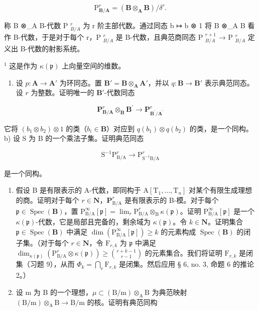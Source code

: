 \[
\mathrm{P} _ {\mathbf {B} / \mathbf {A}} ^ {r} = (\mathbf {B} \otimes_ {\mathbf {A}} \mathbf {B}) / \delta^ {r}.
\]

称 B ⊗\_A B-代数 P \(_{B/A}^{r}\) 为 r 阶主部代数。通过同态 b ↦ b ⊗ 1 将 B ⊗\_A B 看作 B-代数，于是对于每个 r，P \(_{B/A}^{r}\) 是 B-代数，且典范商同态 P \(_{B/A}^{r+1}\) → P \(_{B/A}^{r}\) 定义出 B-代数的射影系统。

\(^{1}\) 这是作为 \(\kappa(\mathfrak{p})\) 上向量空间的维数。

\begin{enumerate}
\def\labelenumi{\alph{enumi})}
\tightlist
\item
  设 \(p: \mathbf{A} \to \mathbf{A}'\) 为环同态。置 \(\mathbf{B}' = \mathbf{B} \otimes_{\mathbf{A}} \mathbf{A}'\)，并以 \(q: \mathbf{B} \to \mathbf{B}'\) 表示典范同态。设 \(r\) 为整数。证明唯一的 \(\mathbf{B}'\)-代数同态
\end{enumerate}

\[
\mathbf {P} _ {\mathbf {B} / \mathbf {A}} ^ {r} \otimes_ {\mathbf {B}} \mathbf {B} ^ {\prime} \rightarrow \mathbf {P} _ {\mathbf {B} ^ {\prime} / \mathbf {A} ^ {\prime}} ^ {r}
\]

它将 \((b_{1} \otimes b_{2}) \otimes 1\) 的类（\(b_{i} \in \mathbf{B}\)）对应到 \(q(b_{1}) \otimes q(b_{2})\) 的类，是一个同构。b) 设 S 为 B 的一个乘法子集。证明典范同态

\[
\mathrm{S} ^ {- 1} \mathrm{P} _ {\mathrm{B/A}} ^ {r} \rightarrow \mathrm{P} _ {\mathrm{S} ^ {- 1} \mathrm{B/A}} ^ {r}
\]

是一个同构。

\begin{enumerate}
\def\labelenumi{\alph{enumi})}
\setcounter{enumi}{2}
\item
  假设 B 是有限表示的 A-代数，即同构于 \(\mathrm{A}[\mathrm{T}_{1},\ldots,\mathrm{T}_{n}]\) 对某个有限生成理想的商。证明对于每个 \(r\in\mathbf{N}\)，\(\mathbf{P}_{\mathrm{B}/\mathrm{A}}^{r}\) 是有限表示的 B-模。对于每个 \(\mathfrak{p}\in\operatorname{Spec}(\mathbf{B})\)，置 \(\mathrm{P}_{\mathrm{B}/\mathrm{A}}^{\infty}[\mathfrak{p}]=\lim_{r}\mathrm{P}_{\mathrm{B}/\mathrm{A}}^{r}\otimes_{\mathrm{B}}\kappa(\mathfrak{p})\)。证明 \(\mathrm{P}_{\mathrm{B}/\mathrm{A}}^{\infty}[\mathfrak{p}]\) 是一个 \(\kappa(\mathfrak{p})\)-代数，它是局部且完备的，剩余域为 \(\kappa(\mathfrak{p})\)。令 \(k\in\mathbf{N}\)。证明集合 \(\mathfrak{p}\in\operatorname{Spec}(\mathbf{B})\) 中满足 \(\dim(\mathrm{P}_{\mathrm{B}/\mathrm{A}}^{\infty}[\mathfrak{p}])\geqslant k\) 的元素构成 \(\operatorname{Spec}(\mathbf{B})\) 的闭子集。（对于每个 \(r\in\mathbf{N}\)，令 \(\mathrm{F}_{r,k}\) 为 \(\mathfrak{p}\) 中满足 \(\dim_{\kappa(\mathfrak{p})}(\mathrm{P}_{\mathrm{B}/\mathrm{A}}^{r}\otimes\kappa(\mathfrak{p}))\geqslant\binom{r+k-1}{r-1}\) 的元素集合。我们将证明 \(\mathrm{F}_{r,k}\) 是闭集（习题 9），从而 \(\Phi_{k}=\bigcap_{r}\mathrm{F}_{r,k}\) 是闭集。然后应用 § 6, no. 3, 命题 6 的推论 2。）
\item
  设 m 为 B 的一个理想，\(\mu\subset(\mathrm{B/m})\otimes_{\mathrm{A}}\mathrm{B}\) 为典范映射 \((\mathrm{B/m})\otimes_{\mathrm{A}}\mathrm{B}\to\mathrm{B/m}\) 的核。证明有典范同构
\end{enumerate}

